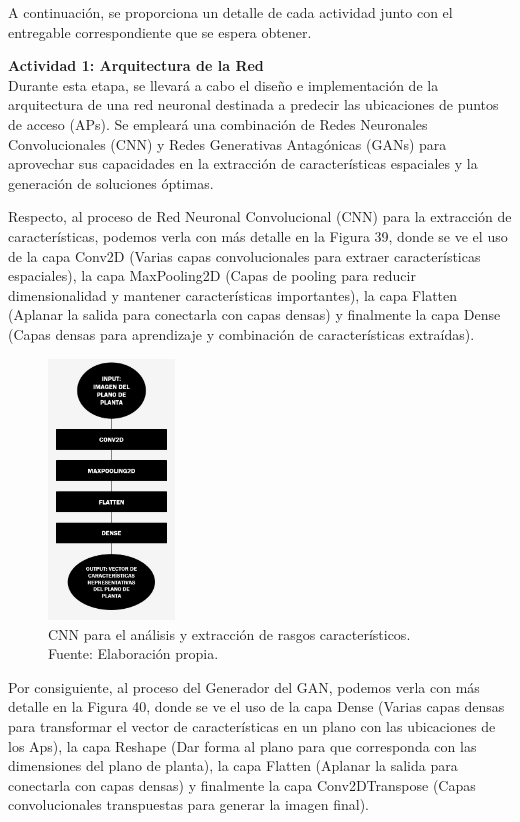A continuación, se proporciona un detalle de cada actividad junto con el entregable correspondiente que se espera obtener.

\textbf{Actividad 1: Arquitectura de la Red}
\\
Durante esta etapa, se llevará a cabo el diseño e implementación de la arquitectura de una red neuronal destinada a predecir las ubicaciones de puntos de acceso (APs). Se empleará una combinación de Redes Neuronales Convolucionales (CNN) y Redes Generativas Antagónicas (GANs) para aprovechar sus capacidades en la extracción de características espaciales y la generación de soluciones óptimas.

Respecto, al proceso de Red Neuronal Convolucional (CNN) para la extracción de características, podemos verla con más detalle en la Figura 39, donde se ve el uso de la capa Conv2D (Varias capas convolucionales para extraer características espaciales), la capa MaxPooling2D (Capas de pooling para reducir dimensionalidad y mantener características importantes), la capa Flatten (Aplanar la salida para conectarla con capas densas) y finalmente la capa Dense (Capas densas para aprendizaje y combinación de características extraídas).

\begin{figure}[H]
	\centering
	\includegraphics[width=0.3\textwidth]{3/figures/CNN_redneuro.jpg}
	\caption[CNN para el análisis y extracción de rasgos característicos]{CNN para el análisis y extracción de rasgos característicos.\\ Fuente: Elaboración propia.}
	\label{3:4}
\end{figure}


Por consiguiente, al proceso del Generador del GAN, podemos verla con más detalle en la Figura 40, donde se ve el uso de la capa Dense (Varias capas densas para transformar el vector de características en un plano con las ubicaciones de los Aps), la capa Reshape (Dar forma al plano para que corresponda con las dimensiones del plano de planta), la capa Flatten (Aplanar la salida para conectarla con capas densas) y finalmente la capa Conv2DTranspose (Capas convolucionales transpuestas para generar la imagen final).

